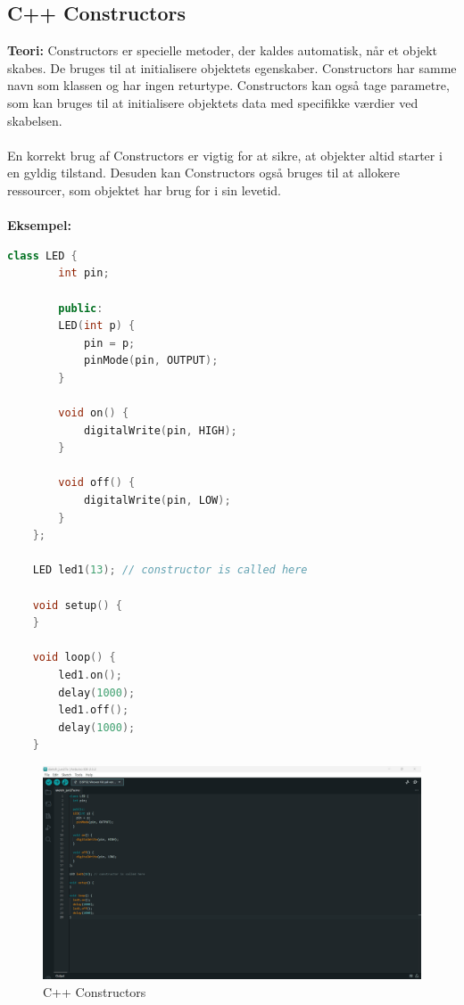 \subsection{C++ Constructors}
\textbf{Teori:} Constructors er specielle metoder, der kaldes automatisk, når et objekt skabes. De bruges til at initialisere objektets egenskaber. Constructors har samme navn som klassen og har ingen returtype. Constructors kan også tage parametre, som kan bruges til at initialisere objektets data med specifikke værdier ved skabelsen.
\\\\
\noindent En korrekt brug af Constructors er vigtig for at sikre, at objekter altid starter i en gyldig tilstand. Desuden kan Constructors også bruges til at allokere ressourcer, som objektet har brug for i sin levetid.
\\\\
\noindent\textbf{Eksempel:}
\begin{lstlisting}[language=C++]
	class LED {
		int pin;
		
		public:
		LED(int p) {
			pin = p;
			pinMode(pin, OUTPUT);
		}
		
		void on() {
			digitalWrite(pin, HIGH);
		}
		
		void off() {
			digitalWrite(pin, LOW);
		}
	};
	
	LED led1(13); // constructor is called here
	
	void setup() {
	}
	
	void loop() {
		led1.on();
		delay(1000);
		led1.off();
		delay(1000);
	}
\end{lstlisting}
\begin{figure}[h!]
	\centering
	\includegraphics[width=\textwidth]{fig/fig17.png}
	\caption{C++ Constructors}
	\label{fig:17}
\end{figure}

